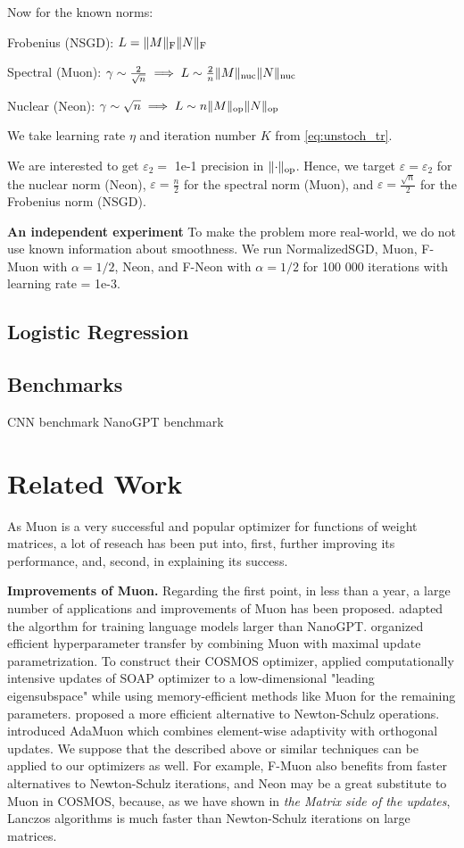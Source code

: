 \documentclass{article} %
\renewcommand{\epsilon}{\varepsilon}
\DeclarePairedDelimiter{\normf}{\|}{\|_\mathrm{F}}
\DeclarePairedDelimiter{\norms}{\|}{\|_{\mathrm{op}}}
\DeclarePairedDelimiter{\normn}{\|}{\|_{\mathrm{nuc}}}
\begin{document}
    Now for the known norms:

    Frobenius (NSGD): $L = \normf{M} \normf{N}$

    Spectral (Muon): $\gamma \sim \frac{2}{\sqrt{n}} \implies L \sim \frac{2}{n}\normn{M}\normn{N}$
    
    Nuclear (Neon): $\gamma \sim \sqrt{n} \implies L \sim n\norms{M}\norms{N}$

    We take learning rate $\eta$ and iteration number $K$ from \cref{eq:unstoch_tr}.


    We are interested to get $\epsilon_2=$ 1e-1 precision in $\norms{\cdot}$. Hence, we target $\epsilon = \epsilon_2$ for the nuclear norm (Neon), $\epsilon = \frac{n}{2}$ for the spectral norm (Muon), and $\epsilon = \frac{\sqrt{n}}{2}$ for the Frobenius norm (NSGD).

    {\bf An independent experiment}
    To make the problem more real-world, we do not use known information about smoothness. We run NormalizedSGD, Muon, F-Muon with $\alpha=1/2$, Neon, and F-Neon with $\alpha=1/2$ for 100 000 iterations with learning rate = 1e-3.
    
    \subsection{Logistic Regression}
    \subsection{Benchmarks}
    CNN benchmark
    NanoGPT benchmark

\section{Related Work}
As Muon \cite{jordan2024muon} is a very successful and popular optimizer for functions of weight matrices, a lot of reseach has been put into, first, further improving its performance, and, second, in explaining its success.

{\bf Improvements of Muon.} Regarding the first point, in less than a year, a large number of applications and improvements of Muon has been proposed. \cite{liu2025muon} adapted the algorthm for training language models larger than NanoGPT. \cite{shah2025practical} organized efficient hyperparameter transfer by combining Muon with maximal update parametrization. To construct their COSMOS optimizer, \cite{chen2025cosmoshybridadaptive} applied computationally intensive updates of SOAP optimizer to a low-dimensional "leading eigensubspace" while using memory-efficient methods like Muon for the remaining parameters. \cite{amsel2025polar} proposed a more efficient alternative to Newton-Schulz operations. \cite{si2025adamuon} introduced AdaMuon which combines element-wise adaptivity with orthogonal updates. We suppose that the described above or similar techniques can be applied to our optimizers as well. For example, F-Muon also benefits from faster alternatives to Newton-Schulz iterations, and Neon may be a great substitute to Muon in COSMOS, because, as we have shown in {\it the Matrix side of the updates}, Lanczos algorithms is much faster than Newton-Schulz iterations on large matrices.
\end{document}
